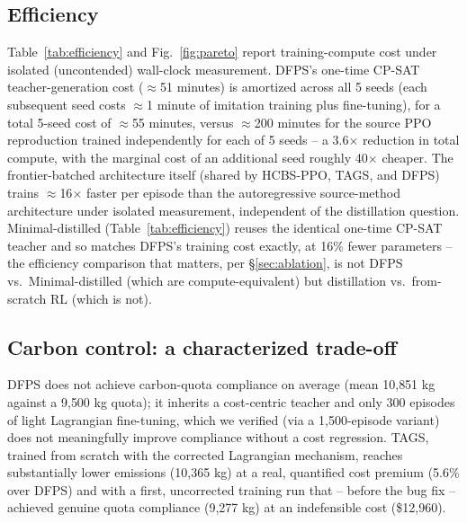 \documentclass[journal]{IEEEtran}
\begin{document}
\subsection{Efficiency}
Table~\ref{tab:efficiency} and Fig.~\ref{fig:pareto} report training-compute cost under isolated (uncontended) wall-clock measurement. DFPS's one-time CP-SAT teacher-generation cost ($\approx$51 minutes) is amortized across all 5 seeds (each subsequent seed costs $\approx$1 minute of imitation training plus fine-tuning), for a total 5-seed cost of $\approx$55 minutes, versus $\approx$200 minutes for the source PPO reproduction trained independently for each of 5 seeds -- a 3.6$\times$ reduction in total compute, with the marginal cost of an additional seed roughly 40$\times$ cheaper. The frontier-batched architecture itself (shared by HCBS-PPO, TAGS, and DFPS) trains $\approx$16$\times$ faster per episode than the autoregressive source-method architecture under isolated measurement, independent of the distillation question. Minimal-distilled (Table~\ref{tab:efficiency}) reuses the identical one-time CP-SAT teacher and so matches DFPS's training cost exactly, at 16\% fewer parameters -- the efficiency comparison that matters, per \S\ref{sec:ablation}, is not DFPS vs.\ Minimal-distilled (which are compute-equivalent) but distillation vs.\ from-scratch RL (which is not).

\subsection{Carbon control: a characterized trade-off}
\label{sec:carbon}
DFPS does not achieve carbon-quota compliance on average (mean 10{,}851 kg against a 9{,}500 kg quota); it inherits a cost-centric teacher and only 300 episodes of light Lagrangian fine-tuning, which we verified (via a 1{,}500-episode variant) does not meaningfully improve compliance without a cost regression. TAGS, trained from scratch with the corrected Lagrangian mechanism, reaches substantially lower emissions (10{,}365 kg) at a real, quantified cost premium (5.6\% over DFPS) and with a first, uncorrected training run that -- before the bug fix -- achieved genuine quota compliance (9{,}277 kg) at an indefensible cost (\$12{,}960).
\end{document}
